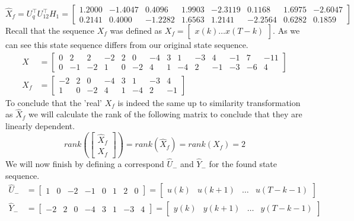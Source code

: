 \begin{equation*}
	\hat{X}_f = U_q^\top U_{12}^\top H_1 = 
	\begin{bmatrix}
		1.2000 &  -1.4047 &   0.4096 &   1.9903 &  -2.3119 &   0.1168 &   1.6975 &  -2.6047\\
		0.2141 &   0.4000 &  -1.2282 &   1.6563 &   1.2141 &  -2.2564 &   0.6282 &   0.1859
	\end{bmatrix}
\end{equation*}
Recall that the sequence $X_f$ was defined as $X_f = \begin{bmatrix} x(k) \dots x(T-k) \end{bmatrix}$. As we can see this state sequence differs from our original state sequence.
\begin{align*}
	X   &= \begin{bmatrix} 0& 2& 2&-2&2& 0&-4&3& 1&-3& 4&-1& 7&-11 \\ 
						   0&-1&-2& 1&0&-2& 4&1&-4& 2&-1&-3&-6& 4 \end{bmatrix} \\
	X_f &= \begin{bmatrix} -2  &   2  &   0  &  -4  &   3  &   1  &  -3  &   4 \\
							1  &   0  &  -2  &   4  &   1  &  -4  &   2  &  -1 \end{bmatrix}
\end{align*}
To conclude that the 'real' $X_f$ is indeed the same up to similarity transformation as $\hat{X}_f$ we will calculate the rank of the following matrix to conclude that they are linearly dependent.
\begin{equation*}
	rank\left(\begin{bmatrix} \hat{X}_f \\ X_f \end{bmatrix}\right) = rank \left( \hat{X}_f \right) = rank \left( X_f \right) = 2
\end{equation*}
We will now finish by defining a correspond $\hat{U}_-$ and $\hat{Y}_-$ for the found state sequence.
\begin{align*}
	\hat{U}_- &= \begin{bmatrix} 1&0&-2&-1&0&1&2&0 \end{bmatrix} = \begin{bmatrix} u(k) & u(k+1) & \dots & u(T-k-1) \end{bmatrix}\\
	\hat{Y}_- &= \begin{bmatrix} -2&2&0&-4&3&1&-3&4 \end{bmatrix} = \begin{bmatrix} y(k) & y(k+1) & \dots & y(T-k-1) \end{bmatrix}
\end{align*}

